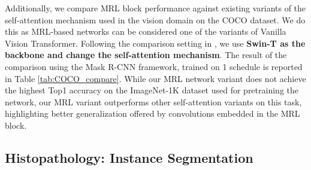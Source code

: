 \documentclass{article}
\begin{document}
\noindent Additionally, we compare MRL block performance against existing variants of the self-attention mechanism used in the vision domain on the COCO dataset. We do this as MRL-based networks can be considered one of the variants of Vanilla Vision Transformer. Following the comparison setting in \cite{DBLP:journals/corr/Swin}, we use \textbf{Swin-T as the backbone and change the self-attention mechanism}. The result of the comparison using the Mask R-CNN framework, trained on 1 schedule is reported in Table \ref{tab:COCO_compare}. While our MRL network variant does not achieve the highest Top1 accuracy on the ImageNet-1K dataset used for pretraining the network, our MRL variant outperforms other self-attention variants on this task, highlighting better generalization offered by convolutions embedded in the MRL block. 

\begin{table}[htbp]
  \centering
  \caption{Comparison between different self-attention mechanism on COCO dataset, using Mask R-CNN framework. Results taken from \cite{DBLP:journals/corr/CSwin}.}
  \label{tab:COCO_compare}\end{table}

\subsection{Histopathology: Instance Segmentation}\label{subsec:MBG}
\end{document}
